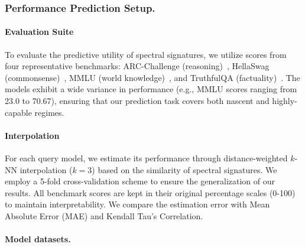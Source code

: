 


\subsubsection{Performance Prediction Setup.}

\noindent\paragraph{Evaluation Suite} To evaluate the predictive utility of spectral signatures, we utilize scores from four representative benchmarks: ARC-Challenge (reasoning)~\cite{clark2018thinksolvedquestionanswering}, HellaSwag (commonsense)~\cite{zellers-etal-2019-hellaswag}, MMLU (world knowledge)~\cite{hendrycks2021measuring}, and TruthfulQA (factuality)~\cite{lin-etal-2022-truthfulqa}. The models exhibit a wide variance in performance (e.g., MMLU scores ranging from 23.0 to 70.67), ensuring that our prediction task covers both nascent and highly-capable regimes.

\noindent\paragraph{Interpolation} For each query model, we estimate its performance through distance-weighted $k$-NN interpolation ($k=3$) based on the similarity of spectral signatures. We employ a 5-fold cross-validation scheme to ensure the generalization of our results. All benchmark scores are kept in their original percentage scales (0-100) to maintain interpretability. We compare the estimation error with Mean Absolute Error (MAE) and Kendall Tau's Correlation.

\paragraph{Model datasets.}


